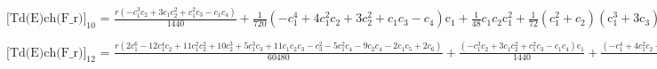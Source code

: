 \documentclass{article}
\newcommand{\unicode}[1]{{}}
\begin{document}
\noindent\(\text{[Td(E)ch(F$\_$r)]}_{10}\text{ = }\frac{r \left(-c_1^3 c_2+3 c_1 c_2^2+c_1^2 c_3-c_1 c_4\right)}{1440}+\frac{1}{720} \left(-c_1^4+4
c_1^2 c_2+3 c_2^2+c_1 c_3-c_4\right) \text{c$\unicode{02bc}$}_1+\frac{1}{48} c_1 c_2 \text{c$\unicode{02bc}$}_1^2+\frac{1}{72} \left(c_1^2+c_2\right)
\left(\text{c$\unicode{02bc}$}_1^3+3 \text{c$\unicode{02bc}$}_3\right)+\frac{1}{48} c_1 \left(\text{c$\unicode{02bc}$}_1^4+4 \text{c$\unicode{02bc}$}_1
\text{c$\unicode{02bc}$}_3-4 \text{c$\unicode{02bc}$}_4\right)+\frac{1}{120} \left(\text{c$\unicode{02bc}$}_1^5+5 \text{c$\unicode{02bc}$}_1^2 \text{c$\unicode{02bc}$}_3-5
\text{c$\unicode{02bc}$}_1 \text{c$\unicode{02bc}$}_4+5 \text{c$\unicode{02bc}$}_5\right)\)

\noindent\(\text{[Td(E)ch(F$\_$r)]}_{12}\text{ = }\frac{r \left(2 c_1^6-12 c_1^4 c_2+11 c_1^2 c_2^2+10 c_2^3+5 c_1^3 c_3+11 c_1 c_2 c_3-c_3^2-5 c_1^2
c_4-9 c_2 c_4-2 c_1 c_5+2 c_6\right)}{60480}+\frac{\left(-c_1^3 c_2+3 c_1 c_2^2+c_1^2 c_3-c_1 c_4\right) \text{c$\unicode{02bc}$}_1}{1440}+\frac{\left(-c_1^4+4
c_1^2 c_2+3 c_2^2+c_1 c_3-c_4\right) \text{c$\unicode{02bc}$}_1^2}{1440}+\frac{1}{144} c_1 c_2 \left(\text{c$\unicode{02bc}$}_1^3+3 \text{c$\unicode{02bc}$}_3\right)+\frac{1}{288}
\left(c_1^2+c_2\right) \left(\text{c$\unicode{02bc}$}_1^4+4 \text{c$\unicode{02bc}$}_1 \text{c$\unicode{02bc}$}_3-4 \text{c$\unicode{02bc}$}_4\right)+\frac{1}{240}
c_1 \left(\text{c$\unicode{02bc}$}_1^5+5 \text{c$\unicode{02bc}$}_1^2 \text{c$\unicode{02bc}$}_3-5 \text{c$\unicode{02bc}$}_1 \text{c$\unicode{02bc}$}_4+5
\text{c$\unicode{02bc}$}_5\right)+\frac{1}{720} \left(\text{c$\unicode{02bc}$}_1^6+6 \text{c$\unicode{02bc}$}_1^3 \text{c$\unicode{02bc}$}_3+3 \text{c$\unicode{02bc}$}_3^2-6
\text{c$\unicode{02bc}$}_1^2 \text{c$\unicode{02bc}$}_4+6 \text{c$\unicode{02bc}$}_1 \text{c$\unicode{02bc}$}_5-6 \text{c$\unicode{02bc}$}_6\right)\)
\end{document}
